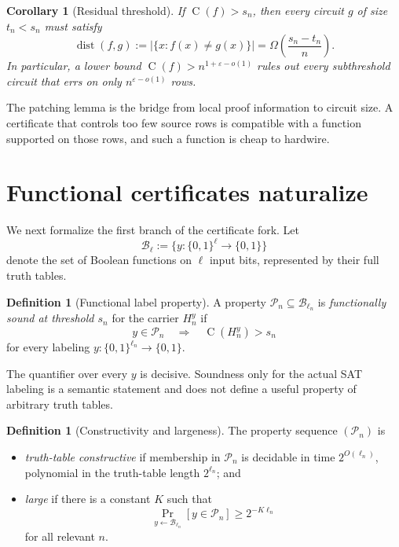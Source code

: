 \documentclass[11pt]{article}
\newtheorem{corollary}[theorem]{Corollary}
\theoremstyle{definition}
\newtheorem{definition}[theorem]{Definition}
\newcommand{\bits}{\{0,1\}}
\newcommand{\Ckt}{\operatorname{C}}
\newcommand{\dist}{\operatorname{dist}}
\newcommand{\eps}{\varepsilon}
\begin{document}
\begin{corollary}[Residual threshold]\label{cor:residual-threshold}
If $\Ckt(f)>s_n$, then every circuit $g$ of size $t_n<s_n$ must satisfy
\begin{equation}\label{eq:error-lower-bound}
  \dist(f,g)
  :=|\{x:f(x)\ne g(x)\}|
  =\Omega\!\left(\frac{s_n-t_n}{n}\right).
\end{equation}
In particular, a lower bound $\Ckt(f)>n^{1+\eps-o(1)}$ rules out every subthreshold circuit that errs on only $n^{\eps-o(1)}$ rows.
\end{corollary}

The patching lemma is the bridge from local proof information to circuit size. A certificate that controls too few source rows is compatible with a function supported on those rows, and such a function is cheap to hardwire.

\section{Functional certificates naturalize}\label{sec:naturalization}

We next formalize the first branch of the certificate fork. Let
\[
  \mathcal{B}_{\ell}:=\{y:\bits^{\ell}\to\bits\}
\]
denote the set of Boolean functions on $\ell$ input bits, represented by their full truth tables.

\begin{definition}[Functional label property]\label{def:functional-property}
A property $\mathcal{P}_n\subseteq\mathcal{B}_{\ell_n}$ is \emph{functionally sound at threshold $s_n$} for the carrier $H_n^y$ if
\begin{equation}\label{eq:functional-soundness}
  y\in\mathcal{P}_n
  \quad\Longrightarrow\quad
  \Ckt(H_n^y)>s_n
\end{equation}
for every labeling $y:\bits^{\ell_n}\to\bits$.
\end{definition}

The quantifier over every $y$ is decisive. Soundness only for the actual SAT labeling is a semantic statement and does not define a useful property of arbitrary truth tables.

\begin{definition}[Constructivity and largeness]\label{def:natural-quantities}
The property sequence $(\mathcal{P}_n)$ is
\begin{itemize}
  \item \emph{truth-table constructive} if membership in $\mathcal{P}_n$ is decidable in time $2^{O(\ell_n)}$, polynomial in the truth-table length $2^{\ell_n}$; and
  \item \emph{large} if there is a constant $K$ such that
  \[
    \Pr_{y\leftarrow\mathcal{B}_{\ell_n}}[y\in\mathcal{P}_n]
    \ge 2^{-K\ell_n}
  \]
  for all relevant $n$.
\end{itemize}
\end{definition}
\end{document}
